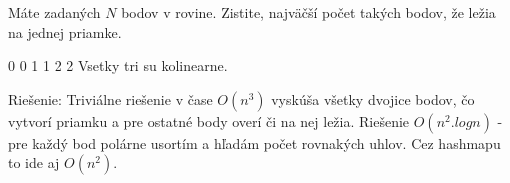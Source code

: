 
Máte zadaných $N$ bodov v rovine. Zistite, najväčší počet
takých bodov, že ležia na jednej priamke.

0 0
1 1
2 2
\komentar
Vsetky tri su kolinearne.
\koniec

Riešenie: Triviálne riešenie v čase $O(n^3)$ vyskúša všetky dvojice
bodov, čo vytvorí priamku a pre ostatné body overí či na nej ležia.
Riešenie $O(n^2.log n)$ - pre každý bod polárne usortím a hľadám počet
rovnakých uhlov. Cez hashmapu to ide aj $O(n^2)$.
